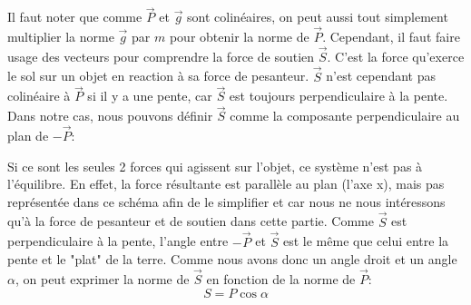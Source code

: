 \documentclass{article}
\begin{document}
Il faut noter que comme $\vec{P}$ et $\vec{g}$ sont colinéaires, on peut aussi tout simplement multiplier la norme $\vec{g}$ par $m$ pour obtenir la norme de $\vec{P}$.
\newline Cependant, il faut faire usage des vecteurs pour comprendre la force de soutien $\vec{S}$. C'est la force qu'exerce le sol sur un objet en reaction à sa force de pesanteur. $\vec{S}$ n'est cependant pas colinéaire à $\vec{P}$ si il y a une pente, car $\vec{S}$ est toujours perpendiculaire à la pente. Dans notre cas, nous pouvons définir $\vec{S}$ comme la composante perpendiculaire au plan de $-\vec{P}$:

\begin{center}
\end{center}

\vspace{0.5cm}

Si ce sont les seules 2 forces qui agissent sur l'objet, ce système n'est pas à l'équilibre. En effet, la force résultante est parallèle au plan (l'axe x), mais pas représentée dans ce schéma afin de le simplifier et car nous ne nous intéressons qu'à la force de pesanteur et de soutien dans cette partie.
Comme $\vec{S}$ est perpendiculaire à la pente, l'angle entre $-\vec{P}$ et $\vec{S}$ est le même que celui entre la pente et le "plat" de la terre. Comme nous avons donc un angle droit et un angle $\alpha$, on peut exprimer la norme de $\vec{S}$ en fonction de la norme de $\vec{P}$:
\begin{equation}
    \label{soutien}
    S=P\cos{\alpha}
\end{equation}
\end{document}

